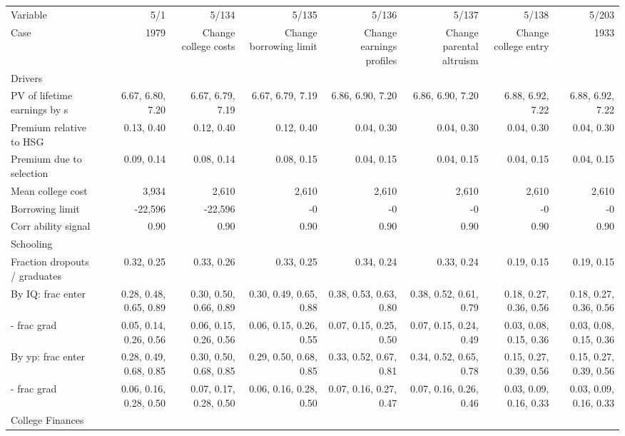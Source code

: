 \begin{tabular}{lrrrrrrr}
\hline
Variable & 5/1  & 5/134  & 5/135  & 5/136  & 5/137  & 5/138  & 5/203  \\ 
Case & 1979  & Change college costs  & Change borrowing limit  & Change earnings profiles  & Change parental altruism  & Change college entry  & 1933  \\ 
Drivers &   &   &   &   &   &   &   \\ 
PV of lifetime earnings by s & 6.67, 6.80, 7.20  & 6.67, 6.79, 7.19  & 6.67, 6.79, 7.19  & 6.86, 6.90, 7.20  & 6.86, 6.90, 7.20  & 6.88, 6.92, 7.22  & 6.88, 6.92, 7.22  \\ 
Premium relative to HSG & 0.13, 0.40  & 0.12, 0.40  & 0.12, 0.40  & 0.04, 0.30  & 0.04, 0.30  & 0.04, 0.30  & 0.04, 0.30  \\ 
Premium due to selection & 0.09, 0.14  & 0.08, 0.14  & 0.08, 0.15  & 0.04, 0.15  & 0.04, 0.15  & 0.04, 0.15  & 0.04, 0.15  \\ 
Mean college cost & 3,934  & 2,610  & 2,610  & 2,610  & 2,610  & 2,610  & 2,610  \\ 
Borrowing limit & -22,596  & -22,596  & -0  & -0  & -0  & -0  & -0  \\ 
Corr ability signal & 0.90  & 0.90  & 0.90  & 0.90  & 0.90  & 0.90  & 0.90  \\ 
\hline
Schooling &   &   &   &   &   &   &   \\ 
Fraction dropouts / graduates & 0.32, 0.25  & 0.33, 0.26  & 0.33, 0.25  & 0.34, 0.24  & 0.33, 0.24  & 0.19, 0.15  & 0.19, 0.15  \\ 
By IQ: frac enter & 0.28, 0.48, 0.65, 0.89  & 0.30, 0.50, 0.66, 0.89  & 0.30, 0.49, 0.65, 0.88  & 0.38, 0.53, 0.63, 0.80  & 0.38, 0.52, 0.61, 0.79  & 0.18, 0.27, 0.36, 0.56  & 0.18, 0.27, 0.36, 0.56  \\ 
- frac grad & 0.05, 0.14, 0.26, 0.56  & 0.06, 0.15, 0.26, 0.56  & 0.06, 0.15, 0.26, 0.55  & 0.07, 0.15, 0.25, 0.50  & 0.07, 0.15, 0.24, 0.49  & 0.03, 0.08, 0.15, 0.36  & 0.03, 0.08, 0.15, 0.36  \\ 
By yp: frac enter & 0.28, 0.49, 0.68, 0.85  & 0.30, 0.50, 0.68, 0.85  & 0.29, 0.50, 0.68, 0.85  & 0.33, 0.52, 0.67, 0.81  & 0.34, 0.52, 0.65, 0.78  & 0.15, 0.27, 0.39, 0.56  & 0.15, 0.27, 0.39, 0.56  \\ 
- frac grad & 0.06, 0.16, 0.28, 0.50  & 0.07, 0.17, 0.28, 0.50  & 0.06, 0.16, 0.28, 0.50  & 0.07, 0.16, 0.27, 0.47  & 0.07, 0.16, 0.26, 0.46  & 0.03, 0.09, 0.16, 0.33  & 0.03, 0.09, 0.16, 0.33  \\ 
\hline
College Finances &   &   &   &   &   &   &   \\ 

\end{tabular}
